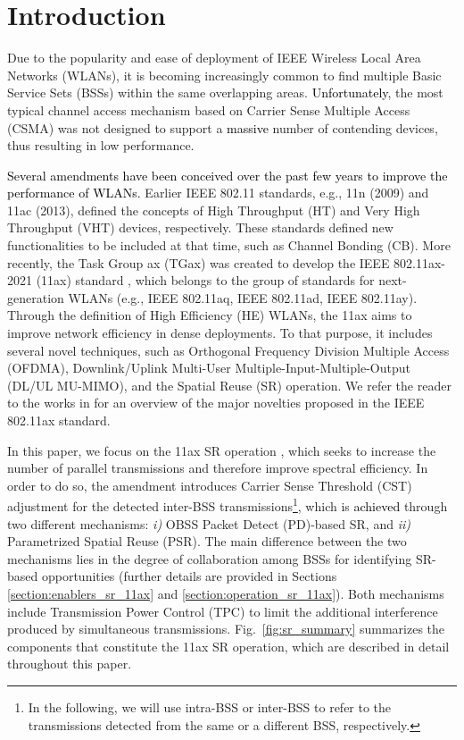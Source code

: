 \documentclass[preprint,12pt]{elsarticle}
\begin{document}
\newpage	
		
\section{Introduction}
\label{section:intro}

Due to the popularity and ease of deployment of IEEE Wireless Local Area Networks (WLANs), it is becoming increasingly common to find multiple Basic Service Sets (BSSs) within the same overlapping areas. \textcolor{black}{Unfortunately}, the most typical channel access mechanism based on Carrier Sense Multiple Access (CSMA) was not designed to support a \textcolor{black}{massive} number of contending devices, thus resulting in low performance.

\textcolor{black}{Several amendments have been conceived over the past few years to improve the performance of WLANs.} Earlier IEEE 802.11 standards, e.g., 11n (2009) and 11ac (2013), defined the concepts of High Throughput (HT) and Very High Throughput (VHT) devices, respectively. These standards defined new functionalities to be included at that time, such as Channel Bonding (CB). More recently, the Task Group ax (TGax) was created to develop the IEEE 802.11ax-2021 (11ax) standard \cite{tgax2019draft}, which belongs to the group of standards for next-generation WLANs (e.g., IEEE 802.11aq, IEEE 802.11ad, IEEE 802.11ay). Through the definition of High Efficiency (HE) WLANs, the 11ax aims to improve network efficiency in dense deployments. To that purpose, it includes several novel techniques, such as Orthogonal Frequency Division Multiple Access (OFDMA), Downlink/Uplink Multi-User Multiple-Input-Multiple-Output (DL/UL MU-MIMO), and the Spatial Reuse (SR) operation. We refer the reader to the works in \cite{bellalta2016ieee, afaqui2016ieee, qu2018survey, khorov2018tutorial} for an overview of the major novelties proposed in the IEEE 802.11ax standard.

In this paper, we focus on the 11ax SR operation \cite{merlin2009methods}, which seeks to increase the number of parallel transmissions and therefore improve spectral efficiency. In order to do so, the amendment introduces Carrier Sense Threshold (CST) adjustment for the detected inter-BSS transmissions\footnote{In the following, we will use intra-BSS or inter-BSS to refer to the transmissions detected from the same or a different BSS, respectively.}, which is \textcolor{black}{achieved} through two different mechanisms: \emph{i)} OBSS Packet Detect (PD)-based SR, and \emph{ii)} Parametrized Spatial Reuse (PSR). The main difference between the two mechanisms lies in the degree of collaboration among BSSs for identifying SR-based opportunities (further details are provided in Sections \ref{section:enablers_sr_11ax} and \ref{section:operation_sr_11ax}). Both mechanisms include Transmission Power Control (TPC) to limit the additional interference produced by simultaneous transmissions. Fig.~\ref{fig:sr_summary} summarizes the components that constitute the 11ax SR operation, which are described in detail throughout this paper.
\end{document}
